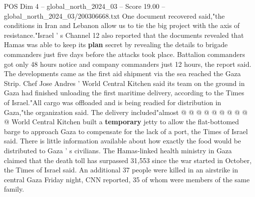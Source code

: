 \begin{textsample}{POS Dim 4 – global\_north\_2024\_03 – Score 19.00 – global\_north\_2024\_03/200306668.txt}
One document recovered said,"the conditions in Iran and Lebanon allow us to tie the big project with the axis of resistance."Israel ' s Channel 12 also reported that the documents revealed that Hamas was able to keep its \textbf{plan} secret by revealing the details to brigade commanders just five days before the attacks took place.
Battalion commanders got only 48 hours notice and company commanders just 12 hours, the report said.
The developments came as the first aid shipment via the sea reached the Gaza Strip.
Chef Jose Andres ' World Central Kitchen said its team on the ground in Gaza had finished unloading the first maritime delivery, according to the Times of Israel."All cargo was offloaded and is being readied for distribution in Gaza,"the organization said.
The delivery included"almost @ @ @ @ @ @ @ @ @ @ World Central Kitchen built a \textbf{temporary} jetty to allow the flat-bottomed barge to approach Gaza to compensate for the lack of a port, the Times of Israel said.
There is little information available about how exactly the food would be distributed to Gaza ' s civilians.
The Hamas-linked health ministry in Gaza claimed that the death toll has surpassed 31,553 since the war started in October, the Times of Israel said.
An additional 37 people were killed in an airstrike in central Gaza Friday night, CNN reported, 35 of whom were members of the same family.

\end{textsample}
